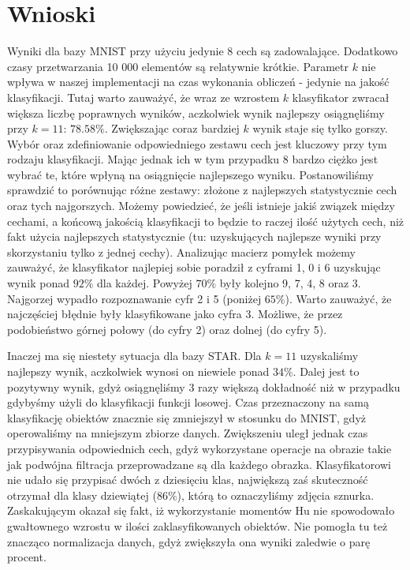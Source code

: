 \documentclass{classrep}
\begin{document}
\section{Wnioski}

Wyniki dla bazy MNIST przy użyciu jedynie 8 cech są zadowalające. Dodatkowo czasy przetwarzania 10 000 elementów są relatywnie krótkie. Parametr $k$ nie wpływa w naszej implementacji na czas wykonania obliczeń - jedynie na jakość klasyfikacji. Tutaj warto zauważyć, że wraz ze wzrostem $k$ klasyfikator zwracał większa liczbę poprawnych wyników, aczkolwiek wynik najlepszy osiągnęliśmy przy $k=11$: $78.58\%$. Zwiększając coraz bardziej $k$ wynik staje się tylko gorszy. Wybór oraz zdefiniowanie odpowiedniego zestawu cech jest kluczowy przy tym rodzaju klasyfikacji. Mając jednak ich w tym przypadku 8 bardzo ciężko jest wybrać te, które wpłyną na osiągnięcie najlepszego wyniku. Postanowiliśmy sprawdzić to porównując różne zestawy: złożone z najlepszych statystycznie cech oraz tych najgorszych. Możemy powiedzieć, że jeśli istnieje jakiś związek między cechami, a końcową jakością klasyfikacji to będzie to raczej ilość użytych cech, niż fakt użycia najlepszych statystycznie (tu: uzyskujących najlepsze wyniki przy skorzystaniu tylko z jednej cechy). Analizując macierz pomyłek możemy zauważyć, że klasyfikator najlepiej sobie poradził z cyframi 1, 0 i 6 uzyskując wynik ponad $92\%$ dla każdej. Powyżej $70\%$ były kolejno 9, 7, 4, 8 oraz 3. Najgorzej wypadło rozpoznawanie cyfr 2 i 5 (poniżej $65\%$). Warto zauważyć, że najczęściej błędnie były klasyfikowane jako cyfra 3. Możliwe, że przez podobieństwo górnej połowy (do cyfry 2) oraz dolnej (do cyfry 5).

Inaczej ma się niestety sytuacja dla bazy STAR. Dla $k = 11$ uzyskaliśmy najlepszy wynik, aczkolwiek wynosi on niewiele ponad $34\%$. Dalej jest to pozytywny wynik, gdyż osiągnęliśmy 3 razy większą dokładność niż w przypadku gdybyśmy użyli do klasyfikacji funkcji losowej. Czas przeznaczony na samą klasyfikację obiektów znacznie się zmniejszył w stosunku do MNIST, gdyż operowaliśmy na mniejszym zbiorze danych. Zwiększeniu uległ jednak czas przypisywania odpowiednich cech, gdyż wykorzystane operacje na obrazie takie jak podwójna filtracja przeprowadzane są dla każdego obrazka. Klasyfikatorowi nie udało się przypisać dwóch z dziesięciu klas, największą zaś skuteczność otrzymał dla klasy dziewiątej ($86\%$), którą to oznaczyliśmy zdjęcia sznurka.
Zaskakującym okazał się fakt, iż wykorzystanie momentów Hu nie spowodowało gwałtownego wzrostu w ilości zaklasyfikowanych obiektów. Nie pomogła tu też znacząco normalizacja danych, gdyż zwiększyła ona wyniki zaledwie o parę procent. 
\end{document}
